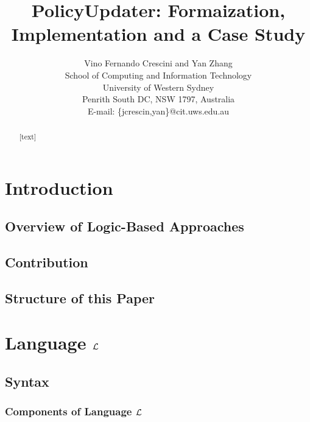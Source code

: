 \documentclass[10pt, twocolumn]{article}
\begin{document}
  \title{PolicyUpdater: Formaization, Implementation and a Case Study}
  \author{Vino Fernando Crescini and Yan Zhang \\
          School of Computing and Information Technology \\
          University of Western Sydney \\
          Penrith South DC, NSW 1797, Australia \\
          E-mail: \{jcrescin,yan\}@cit.uws.edu.au}

  \date{}

  \maketitle

  \begin{abstract}
    [text]
  \end{abstract}

  \section{Introduction}

    \subsection{Overview of Logic-Based Approaches}

    \subsection{Contribution}

    \subsection{Structure of this Paper}

  \section{Language $\cal{L}$}

    \subsection{Syntax}

      \subsubsection{Components of Language $\cal{L}$}
\end{document}
